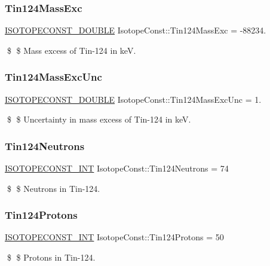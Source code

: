 \subsubsection{\texorpdfstring{Tin124\+Mass\+Exc}{Tin124MassExc}}
{\footnotesize\ttfamily \mbox{\hyperlink{group___isotope_const-_macros_ga8f45a7272ce02c0b4c65c44636ed719a}{I\+S\+O\+T\+O\+P\+E\+C\+O\+N\+S\+T\+\_\+\+D\+O\+U\+B\+LE}} Isotope\+Const\+::\+Tin124\+Mass\+Exc = -\/88234.}

\$ \$ Mass excess of Tin-\/124 in keV. \mbox{\label{group___isotope_const-_tin-_sn124_gacdfa71db3844e12caeffab38debfd5c2}} 
\subsubsection{\texorpdfstring{Tin124\+Mass\+Exc\+Unc}{Tin124MassExcUnc}}
{\footnotesize\ttfamily \mbox{\hyperlink{group___isotope_const-_macros_ga8f45a7272ce02c0b4c65c44636ed719a}{I\+S\+O\+T\+O\+P\+E\+C\+O\+N\+S\+T\+\_\+\+D\+O\+U\+B\+LE}} Isotope\+Const\+::\+Tin124\+Mass\+Exc\+Unc = 1.}

\$ \$ Uncertainty in mass excess of Tin-\/124 in keV. \mbox{\label{group___isotope_const-_tin-_sn124_ga6e1c61423234cbaba841b10400450cbe}} 
\subsubsection{\texorpdfstring{Tin124\+Neutrons}{Tin124Neutrons}}
{\footnotesize\ttfamily \mbox{\hyperlink{group___isotope_const-_macros_ga5f18360b3e99483a35c32d789e62621c}{I\+S\+O\+T\+O\+P\+E\+C\+O\+N\+S\+T\+\_\+\+I\+NT}} Isotope\+Const\+::\+Tin124\+Neutrons = 74}

\$ \$ Neutrons in Tin-\/124. \mbox{\label{group___isotope_const-_tin-_sn124_ga9e28033fd66ed5bf594d3dbe2e5ca120}} 
\subsubsection{\texorpdfstring{Tin124\+Protons}{Tin124Protons}}
{\footnotesize\ttfamily \mbox{\hyperlink{group___isotope_const-_macros_ga5f18360b3e99483a35c32d789e62621c}{I\+S\+O\+T\+O\+P\+E\+C\+O\+N\+S\+T\+\_\+\+I\+NT}} Isotope\+Const\+::\+Tin124\+Protons = 50}

\$ \$ Protons in Tin-\/124. 